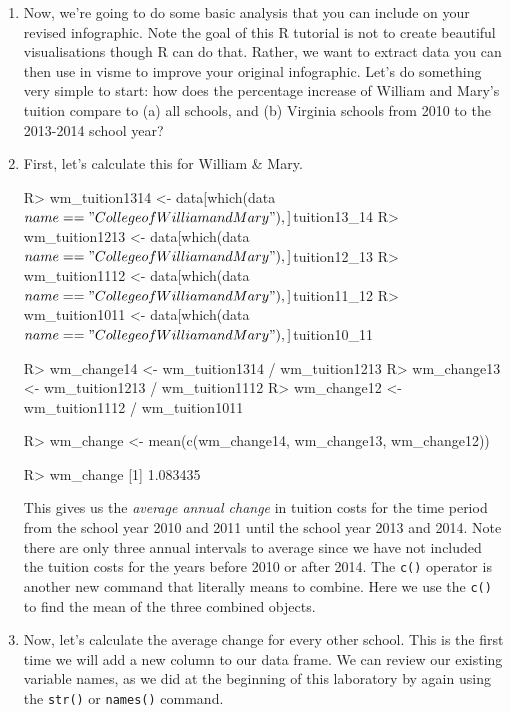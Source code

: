 \documentclass{article}
\newenvironment{Schunk}{}{}
\newcommand{\code}[1]{\texttt{#1}}
\newcommand{\proglang}[1]{\textsf{#1}}
\begin{document}
{\begin{enumerate}[leftmargin=15mm]
\item Now, we're going to do some basic analysis that you can include on your revised infographic.  Note the goal of this \proglang{R} tutorial is not to create beautiful visualisations though \proglang{R} can do that.  Rather, we want to extract data you can then use in visme to improve your original infographic.  Let's do something very simple to start: how does the percentage increase of William and Mary's tuition compare to (a) all schools, and (b) Virginia schools from 2010 to the 2013-2014 school year?

\item First, let's calculate this for William \& Mary.

\begin{Schunk}
\begin{Sinput}

R> wm_tuition1314 <- data[which(data$name == "College of 
William and Mary"), ]$tuition13_14
R> wm_tuition1213 <- data[which(data$name == "College of 
William and Mary"), ]$tuition12_13
R> wm_tuition1112 <- data[which(data$name == "College of 
William and Mary"), ]$tuition11_12
R> wm_tuition1011 <- data[which(data$name == "College of 
William and Mary"), ]$tuition10_11

R> wm_change14 <- wm_tuition1314 / wm_tuition1213
R> wm_change13 <- wm_tuition1213 / wm_tuition1112
R> wm_change12 <- wm_tuition1112 / wm_tuition1011

R> wm_change <- mean(c(wm_change14, wm_change13, wm_change12))

R> wm_change
[1] 1.083435

\end{Sinput}
\end{Schunk}

This gives us the \textit{average annual change} in tuition costs for the time period from the school year 2010 and 2011 until the school year 2013 and 2014.  Note there are only three annual intervals to average since we have not included the tuition costs for the years before 2010 or after 2014.  The \code{c()} operator is another new command that literally means to combine.  Here we use the \code{c()} to find the mean of the three combined objects.

\item Now, let's calculate the average change for every other school.  This is the first time we will add a new column to our data frame.  We can review our existing variable names, as we did at the beginning of this laboratory by again using the \code{str()} or \code{names()} command.


\end{enumerate}}
\end{document}
